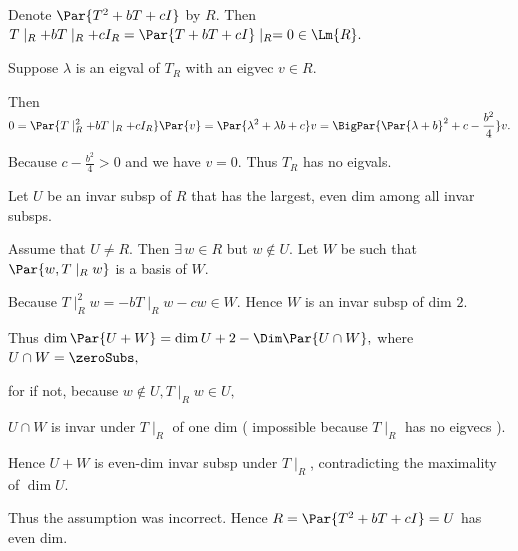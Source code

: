 \par
{}\par\quad
Denote $\null\Par{T^2 + bT + cI}$ by $R.$ Then $T\mid_R+bT\mid_R+cI_R=\Par{T+bT+cI}\mid_R=0\in\Lm{R}.$\par\quad
Suppose $\lambda$ is an eigval of $T_R$ with an eigvec $v\in R.$\par\quad
Then $\displaystyle 0=\Par{T\mid_R^2+bT\mid_R+cI_R}\Par{v}=\Par{\lambda^2+\lambda b+c}v=\BigPar{\Par{\lambda+b}^2+c-\frac{b^2}{4}}v.$\par\quad
Because $\displaystyle c-\frac{b^2}{4}>0$ and we have $v=0.$ Thus $T_R$ has no eigvals.\par\quad
Let $U$ be an invar subsp of $R$ that has the largest, even dim among all invar subsps.\par\quad
Assume that $U\neq R.$ Then $\exists\,w\in R$ but $w\not\in U.$ Let $W$ be such that $\Par{w,T\mid_R w}$ is a basis of $W.$\par\quad
Because $T\mid_R^2 w=-bT\mid_R w-cw\in W.$ Hence $W$ is an invar subsp of dim $2.$\par\quad
Thus $\dim \Par{U+W}=\dim U+2-\Dim\Par{U\cap W},$ where $U\cap W=\zeroSubs,$\par\qquad\qquad
for if not, because $w\not\in U,T\mid_R w\in U,$\par\qquad\qquad $U\cap W$ is invar under $T\mid_R$ of one dim ( impossible because $T\mid_R$ has no eigvecs ).\par\quad
Hence $U+W$ is even-dim invar subsp under $T\mid_R$, contradicting the maximality of $\dim U.$\par\quad
Thus the assumption was incorrect. Hence $R=\null\Par{T^2+bT+cI}=U$ has even dim.\PfEnd
\SepLine

